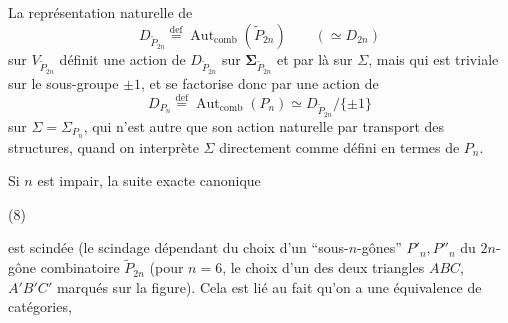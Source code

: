 La représentation naturelle de 
\[
\tag{6}D_{\widetilde P_{2n}}\overset{\mathrm{def}}=\operatorname{Aut}_{\mathrm{comb}}(\widetilde P_{2n})
\qquad(\simeq D_{2n})
\]
sur $V_{\widetilde P_{2n}}$ définit une action de $D_{\widetilde P_{2n}}$ sur $\boldsymbol\Sigma_{\widetilde P_{2n}}$ et par là sur $\Sigma$, mais qui est triviale sur le sous-groupe $\pm1$, et se factorise donc par une action de
\[
\tag{7}D_{P_n}\overset{\mathrm{def}}=\operatorname{Aut}_{\mathrm{comb}}(P_n)
\simeq D_{\widetilde P_{2n}}/\{\pm1\}
\]
sur $\Sigma=\Sigma_{P_n}$, qui n'est autre que son action naturelle par transport des structures, quand on interprète $\Sigma$ directement comme défini en termes de $P_n$.

 Si $n$ est impair, la suite exacte canonique

(8)

est scindée  (le  scindage dépendant du choix d'un  ``sous-$n$-gônes'' $P'_n,P''_n$ du $2n$-gône combinatoire $\widetilde P_{2n}$ (pour $n=6$, le choix d'un des deux triangles $ABC$, $A'B'C'$ marqués sur la figure). Cela est lié au fait qu'on a une équivalence de catégories, 


